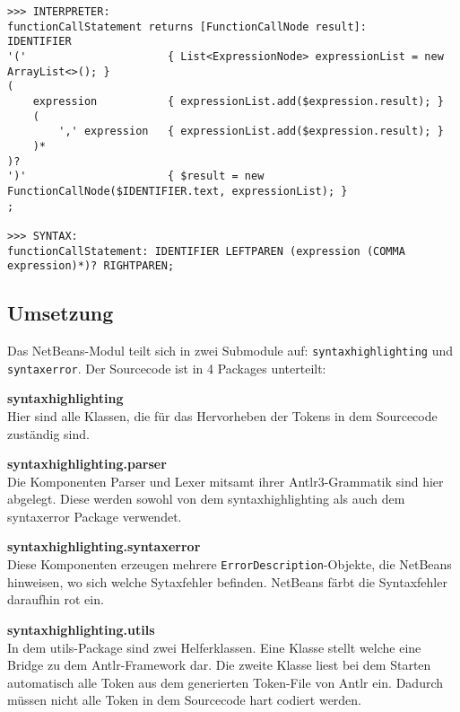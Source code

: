 \begin{lstlisting}[label={lst:diffInterpreterSyntax2}, caption={Grammatik-Regel ``functionCallStatement'' Interpreter vs Syntax}, captionpos=b, breaklines=true, postbreak=\mbox{\textcolor{red}{$\hookrightarrow$}\space}]
>>> INTERPRETER:
functionCallStatement returns [FunctionCallNode result]:
IDENTIFIER
'('                      { List<ExpressionNode> expressionList = new ArrayList<>(); }
(
    expression           { expressionList.add($expression.result); }
    (
        ',' expression   { expressionList.add($expression.result); }
    )*
)?
')'                      { $result = new FunctionCallNode($IDENTIFIER.text, expressionList); }
;

>>> SYNTAX:
functionCallStatement: IDENTIFIER LEFTPAREN (expression (COMMA expression)*)? RIGHTPAREN;
\end{lstlisting}

\subsection{Umsetzung}
Das NetBeans-Modul teilt sich in zwei Submodule auf:
\texttt{syntaxhighlighting} und \texttt{syntaxerror}.
Der Sourcecode ist in 4 Packages unterteilt:

\begin{description}
\item{\textbf{syntaxhighlighting}} \\
Hier sind alle Klassen, die für das Hervorheben der Tokens in dem Sourcecode zuständig sind.

\item{\textbf{syntaxhighlighting.parser}} \\
Die Komponenten Parser und Lexer mitsamt ihrer Antlr3-Grammatik sind hier abgelegt.
Diese werden sowohl von dem syntaxhighlighting als auch dem syntaxerror Package verwendet.

\item{\textbf{syntaxhighlighting.syntaxerror}} \\
Diese Komponenten erzeugen mehrere \texttt{ErrorDescription}-Objekte, die NetBeans hinweisen, wo sich welche Sytaxfehler befinden.
NetBeans färbt die Syntaxfehler daraufhin rot ein.

\item{\textbf{syntaxhighlighting.utils}} \\
In dem utils-Package sind zwei Helferklassen.
Eine Klasse stellt welche eine Bridge zu dem Antlr-Framework dar.
Die zweite Klasse liest bei dem Starten automatisch alle Token aus dem generierten Token-File von Antlr ein.
Dadurch müssen nicht alle Token in dem Sourcecode hart codiert werden.

\end{description}

